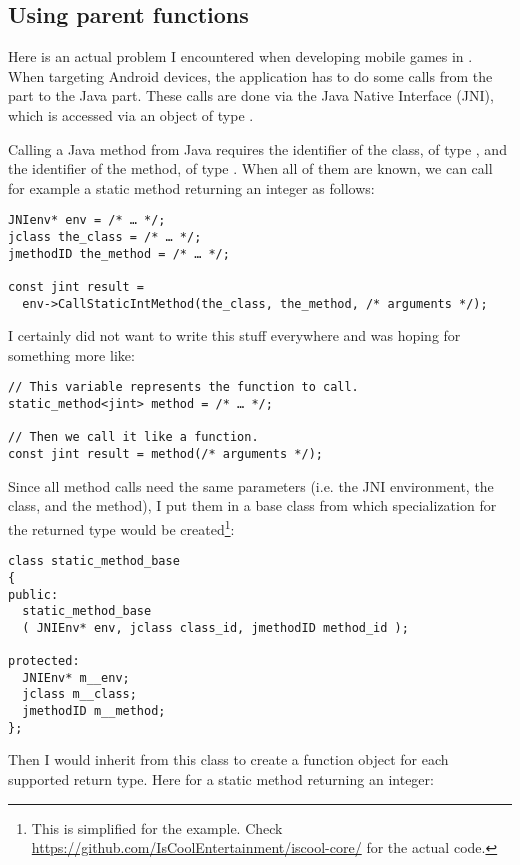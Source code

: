 \subsection{Using parent functions}

Here is an actual problem I encountered when developing mobile games
in \cpp{}. When targeting Android devices, the application has to do
some calls from the \cpp{} part to the Java part. These calls are done
via the Java Native Interface (JNI), which is accessed via an object
of type .

Calling a Java method from Java requires the identifier of the class,
of type , and the identifier of the method, of type
. When all of them are known, we can call for example
a static method returning an integer as follows:

\begin{lstlisting}
JNIenv* env = /* … */;
jclass the_class = /* … */;
jmethodID the_method = /* … */;

const jint result =
  env->CallStaticIntMethod(the_class, the_method, /* arguments */);
\end{lstlisting}

I certainly did not want to write this stuff everywhere and was hoping
for something more like:

\begin{lstlisting}
// This variable represents the function to call.
static_method<jint> method = /* … */;

// Then we call it like a function.
const jint result = method(/* arguments */);
\end{lstlisting}

Since all method calls need the same parameters (i.e. the JNI
environment, the class, and the method), I put them in a base class
from which specialization for the returned type would be
created\footnote{This is simplified for the example. Check
  \url{https://github.com/IsCoolEntertainment/iscool-core/} for the
  actual code.}:

\begin{lstlisting}
class static_method_base
{
public:
  static_method_base
  ( JNIEnv* env, jclass class_id, jmethodID method_id );

protected:
  JNIEnv* m__env;
  jclass m__class;
  jmethodID m__method;
};
\end{lstlisting}

Then I would inherit from this class to create a function object for
each supported return type. Here for a static method returning an
integer:

